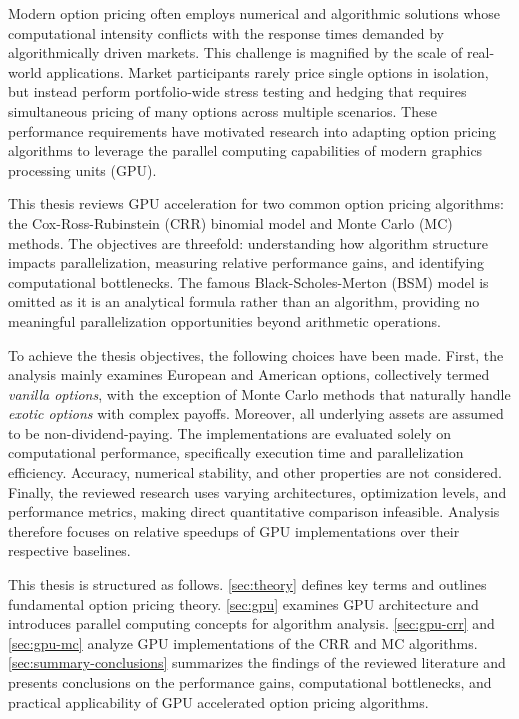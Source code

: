 \documentclass[english,12pt,a4paper,pdftex,sci,utf8]{aaltothesis}
\begin{document}
Modern option pricing often employs numerical and algorithmic solutions whose computational intensity conflicts with the response times demanded by algorithmically driven markets. This challenge is magnified by the scale of real-world applications. Market participants rarely price single options in isolation, but instead perform portfolio-wide stress testing and hedging that requires simultaneous pricing of many options across multiple scenarios. These performance requirements have motivated research into adapting option pricing algorithms to leverage the parallel computing capabilities of modern graphics processing units (GPU).

This thesis reviews GPU acceleration for two common option pricing algorithms: the Cox-Ross-Rubinstein (CRR) binomial model and Monte Carlo (MC) methods. The objectives are threefold: understanding how algorithm structure impacts parallelization, measuring relative performance gains, and identifying computational bottlenecks. The famous Black-Scholes-Merton (BSM) model is omitted as it is an analytical formula rather than an algorithm, providing no meaningful parallelization opportunities beyond arithmetic operations.

To achieve the thesis objectives, the following choices have been made. First, the analysis mainly examines European and American options, collectively termed \emph{vanilla options}, with the exception of Monte Carlo methods that naturally handle \emph{exotic options} with complex payoffs. Moreover, all underlying assets are assumed to be non-dividend-paying. The implementations are evaluated solely on computational performance, specifically execution time and parallelization efficiency. Accuracy, numerical stability, and other properties are not considered. Finally, the reviewed research uses varying architectures, optimization levels, and performance metrics, making direct quantitative comparison infeasible. Analysis therefore focuses on relative speedups of GPU implementations over their respective baselines.

This thesis is structured as follows. \cref{sec:theory} defines key terms and outlines fundamental option pricing theory. \cref{sec:gpu} examines GPU architecture and introduces parallel computing concepts for algorithm analysis. \cref{sec:gpu-crr} and \cref{sec:gpu-mc} analyze GPU implementations of the CRR and MC algorithms. \cref{sec:summary-conclusions} summarizes the findings of the reviewed literature and presents conclusions on the performance gains, computational bottlenecks, and practical applicability of GPU accelerated option pricing algorithms.
\clearpage
\end{document}

